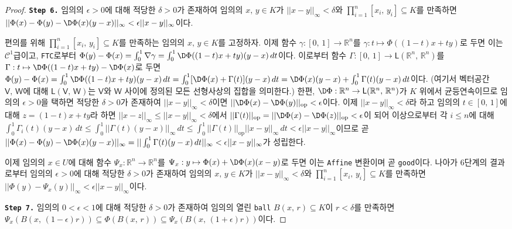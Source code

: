 \begin{proof}
    \noindent\texttt{\textbf{Step 6.}} 임의의 $\epsilon>0$에 대해 적당한 $\delta>0$가 존재하여 임의의 $x,\,y\in K$가 $||x-y||_\infty<\delta$와 $\prod_{i=1}^n[x_i,\,y_i]\subseteq K$를 만족하면 $||\Phi(x)-\Phi(y)-\D\Phi(x)(y-x)||_\infty<\epsilon||x-y||_\infty$이다.

    편의를 위해 $\prod_{i=1}^n[x_i,\,y_i]\subseteq K$를 만족하는 임의의 $x,\,y\in K$를 고정하자. 이제 함수 $\gamma:[0,\,1]\to\mathbb{R}^n$를 $\gamma:t\mapsto\Phi((1-t)x+ty)$로 두면 이는 $\mathcal{C}^1$급이고, \texttt{FTC}로부터 $\Phi(y)-\Phi(x)=\int_0^1\nabla\gamma=\int_0^1\D\Phi((1-t)x+ty)(y-x)\,dt$이다. 이로부터 함수 $\Gamma:[0,\,1]\to\mathsf{L}(\mathbb{R}^n,\,\mathbb{R}^n)$를 $\Gamma:t\mapsto\D\Phi((1-t)x+ty)-\D\Phi(x)$로 두면 $\Phi(y)-\Phi(x)=\int_0^1\D\Phi((1-t)x+ty)(y-x)\,dt=\int_0^1[\D\Phi(x)+\Gamma(t)](y-x)\,dt=\D\Phi(x)(y-x)+\int_0^1\Gamma(t)(y-x)\,dt$이다. (여기서 벡터공간 $\mathsf{V},\,\mathsf{W}$에 대해 $\mathsf{L}(\mathsf{V},\,\mathsf{W})$는 $\mathsf{V}$와 $\mathsf{W}$ 사이에 정의된 모든 선형사상의 집합을 의미한다.) 한편, $\D\Phi:\mathbb{R}^n\to\mathsf{L}(\mathbb{R}^n,\,\mathbb{R}^n)$가 $K$ 위에서 균등연속이므로 임의의 $\epsilon>0$을 택하면 적당한 $\delta>0$가 존재하여 $||x-y||_\infty<\delta$이면 $||\D\Phi(x)-\D\Phi(y)||_\mathrm{op}<\epsilon$이다. 이제 $||x-y||_\infty<\delta$라 하고 임의의 $t\in[0,\,1]$에 대해 $z=(1-t)x+ty$라 하면 $||x-z||_\infty\leq||x-y||_\infty<\delta$에서 $||\Gamma(t)||_\mathrm{op}=||\D\Phi(x)-\D\Phi(z)||_\mathrm{op}<\epsilon$이 되어 이상으로부터 각 $i\leq n$에 대해 $\int_0^1\Gamma_i(t)(y-x)\,dt\leq\int_0^1||\Gamma(t)(y-x)||_\infty\,dt\leq\int_0^1||\Gamma(t)||_\mathrm{op}||x-y||_\infty\,dt<\epsilon||x-y||_\infty$이므로 곧 $||\Phi(x)-\Phi(y)-\D\Phi(x)(y-x)||_\infty=||\int_0^1\Gamma(t)(y-x)\,dt||_\infty<\epsilon||x-y||_\infty$가 성립한다.

    이제 임의의 $x\in U$에 대해 함수 $\Psi_x:\mathbb{R}^n\to\mathbb{R}^n$를 $\Psi_x:y\mapsto\Phi(x)+\D\Phi(x)(x-y)$로 두면 이는 \texttt{Affine} 변환이며 곧 \texttt{good}이다. 나아가 6단계의 결과로부터 임의의 $\epsilon>0$에 대해 적당한 $\delta>0$가 존재하여 임의의 $x,\,y\in K$가 $||x-y||_\infty<\delta$와 $\prod_{i=1}^n[x_i,\,y_i]\subseteq K$를 만족하면 $||\Phi(y)-\Psi_{x}(y)||_\infty<\epsilon||x-y||_\infty$이다.

    \noindent\texttt{\textbf{Step 7.}} 임의의 $0<\epsilon<1$에 대해 적당한 $\delta>0$가 존재하여 임의의 열린 \texttt{ball} $B(x,\,r)\subseteq K$이 $r<\delta$를 만족하면 $\Psi_x(B(x,\,(1-\epsilon)r))\subseteq\Phi(B(x,\,r))\subseteq\Psi_x(B(x,\,(1+\epsilon)r))$이다.


\end{proof}
